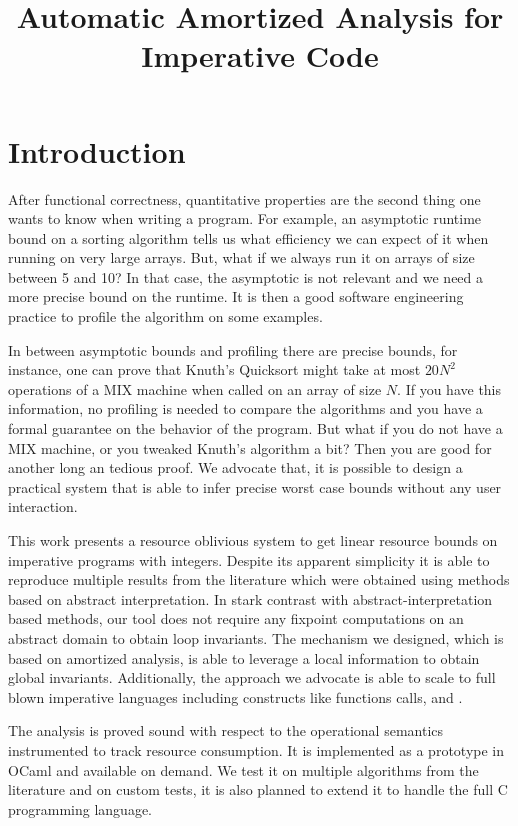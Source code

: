 \documentclass[10pt]{article}
\title{Automatic Amortized Analysis for Imperative Code}
\date{}
\author{}
\begin{document}
\maketitle

\section{Introduction}

After functional correctness, quantitative properties are the
second thing one wants to know when writing a program.
For example, an asymptotic runtime bound on a
sorting algorithm tells us what efficiency we can expect
of it when running on very large arrays.  But, what if we
always run it on arrays of size between 5 and 10? In that
case, the asymptotic is not relevant and we need a more
precise bound on the runtime.  It is then a good
software engineering practice to profile the algorithm on
some examples.

In between asymptotic bounds and profiling there are
precise bounds, for instance, one can prove that Knuth's Quicksort might
take at most $20N^2$ operations of a MIX machine when
called on an array of size $N$.  If you have this information,
no profiling is needed to compare the algorithms and you
have a formal guarantee on the behavior of the program. But what if you do not
have a MIX machine, or you tweaked Knuth's algorithm
a bit?  Then you are good for another long an tedious
proof.  We advocate that, it is possible to design a practical
system that is able to infer precise worst case bounds
without any user interaction.

This work presents a resource oblivious system to get
linear resource bounds on imperative programs with
integers.  Despite its apparent simplicity it is able to
reproduce multiple results from the literature which
were obtained using methods based on abstract
interpretation.  In stark contrast with abstract-interpretation
based methods, our tool does not require any
fixpoint computations on an abstract domain to obtain
loop invariants.  The mechanism we designed, which
is based on amortized analysis, is able to leverage a local
information to obtain global invariants.  Additionally, the
approach we advocate is able to scale to full blown
imperative languages including constructs like functions
calls,  and .

The analysis is proved sound with respect to
the operational semantics instrumented to track resource
consumption.  It is implemented as a prototype
in OCaml and available on demand.  We test it on multiple
algorithms from the literature and on custom tests, it
is also planned to extend it to handle the full C programming
language.
\end{document}
